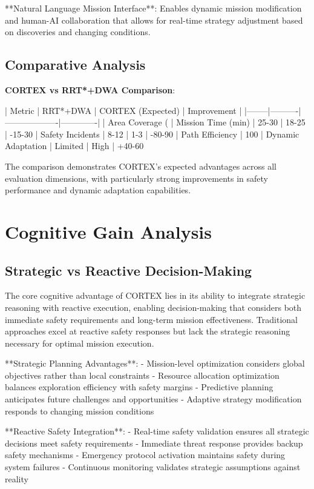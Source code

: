 **Natural Language Mission Interface**: Enables dynamic mission modification and human-AI collaboration that allows for real-time strategy adjustment based on discoveries and changing conditions.

\subsection{Comparative Analysis}

\textbf{CORTEX vs RRT*+DWA Comparison}:

| Metric | RRT*+DWA | CORTEX (Expected) | Improvement |
|--------|----------|-------------------|-------------|
| Area Coverage (%
| Mission Time (min) | 25-30 | 18-25 | -15-30%
| Safety Incidents | 8-12 | 1-3 | -80-90%
| Path Efficiency | 100%
| Dynamic Adaptation | Limited | High | +40-60%

The comparison demonstrates CORTEX's expected advantages across all evaluation dimensions, with particularly strong improvements in safety performance and dynamic adaptation capabilities.

\section{Cognitive Gain Analysis}

\subsection{Strategic vs Reactive Decision-Making}

The core cognitive advantage of CORTEX lies in its ability to integrate strategic reasoning with reactive execution, enabling decision-making that considers both immediate safety requirements and long-term mission effectiveness. Traditional approaches excel at reactive safety responses but lack the strategic reasoning necessary for optimal mission execution.

**Strategic Planning Advantages**:
- Mission-level optimization considers global objectives rather than local constraints
- Resource allocation optimization balances exploration efficiency with safety margins
- Predictive planning anticipates future challenges and opportunities
- Adaptive strategy modification responds to changing mission conditions

**Reactive Safety Integration**:
- Real-time safety validation ensures all strategic decisions meet safety requirements
- Immediate threat response provides backup safety mechanisms
- Emergency protocol activation maintains safety during system failures
- Continuous monitoring validates strategic assumptions against reality

